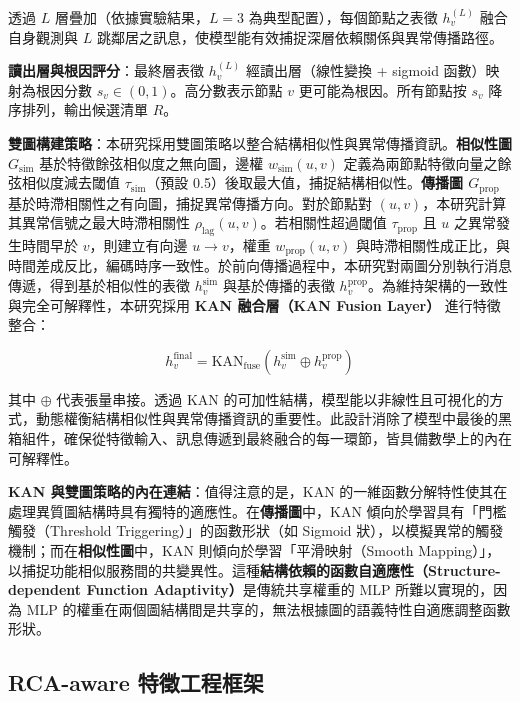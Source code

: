\documentclass[10pt,a4paper,twocolumn]{article}
\begin{document}
透過 $L$ 層疊加（依據實驗結果，$L=3$ 為典型配置），每個節點之表徵 $h_v^{(L)}$ 融合自身觀測與 $L$ 跳鄰居之訊息，使模型能有效捕捉深層依賴關係與異常傳播路徑。

\textbf{讀出層與根因評分}：最終層表徵 $h_v^{(L)}$ 經讀出層（線性變換 + sigmoid 函數）映射為根因分數 $s_v \in (0, 1)$。高分數表示節點 $v$ 更可能為根因。所有節點按 $s_v$ 降序排列，輸出候選清單 $R$。

\textbf{雙圖構建策略}：本研究採用雙圖策略以整合結構相似性與異常傳播資訊。\textbf{相似性圖 $G_{\text{sim}}$} 基於特徵餘弦相似度之無向圖，邊權 $w_{\text{sim}}(u, v)$ 定義為兩節點特徵向量之餘弦相似度減去閾值 $\tau_{\text{sim}}$（預設 0.5）後取最大值，捕捉結構相似性。\textbf{傳播圖 $G_{\text{prop}}$} 基於時滯相關性之有向圖，捕捉異常傳播方向。對於節點對 $(u, v)$，本研究計算其異常信號之最大時滯相關性 $\rho_{\text{lag}}(u, v)$。若相關性超過閾值 $\tau_{\text{prop}}$ 且 $u$ 之異常發生時間早於 $v$，則建立有向邊 $u \to v$，權重 $w_{\text{prop}}(u, v)$ 與時滯相關性成正比，與時間差成反比，編碼時序一致性。於前向傳播過程中，本研究對兩圖分別執行消息傳遞，得到基於相似性的表徵 $h_v^{\text{sim}}$ 與基於傳播的表徵 $h_v^{\text{prop}}$。為維持架構的一致性與完全可解釋性，本研究採用 \textbf{KAN 融合層（KAN Fusion Layer）} 進行特徵整合：

\begin{equation}
h_v^{\text{final}} = \text{KAN}_{\text{fuse}}\left( h_v^{\text{sim}} \oplus h_v^{\text{prop}} \right)
\end{equation}

其中 $\oplus$ 代表張量串接。透過 KAN 的可加性結構，模型能以非線性且可視化的方式，動態權衡結構相似性與異常傳播資訊的重要性。此設計消除了模型中最後的黑箱組件，確保從特徵輸入、訊息傳遞到最終融合的每一環節，皆具備數學上的內在可解釋性。

\textbf{KAN 與雙圖策略的內在連結}：值得注意的是，KAN 的一維函數分解特性使其在處理異質圖結構時具有獨特的適應性。在\textbf{傳播圖}中，KAN 傾向於學習具有「門檻觸發（Threshold Triggering）」的函數形狀（如 Sigmoid 狀），以模擬異常的觸發機制；而在\textbf{相似性圖}中，KAN 則傾向於學習「平滑映射（Smooth Mapping）」，以捕捉功能相似服務間的共變異性。這種\textbf{結構依賴的函數自適應性（Structure-dependent Function Adaptivity）}是傳統共享權重的 MLP 所難以實現的，因為 MLP 的權重在兩個圖結構間是共享的，無法根據圖的語義特性自適應調整函數形狀。

\subsection{RCA-aware 特徵工程框架}
\end{document}
